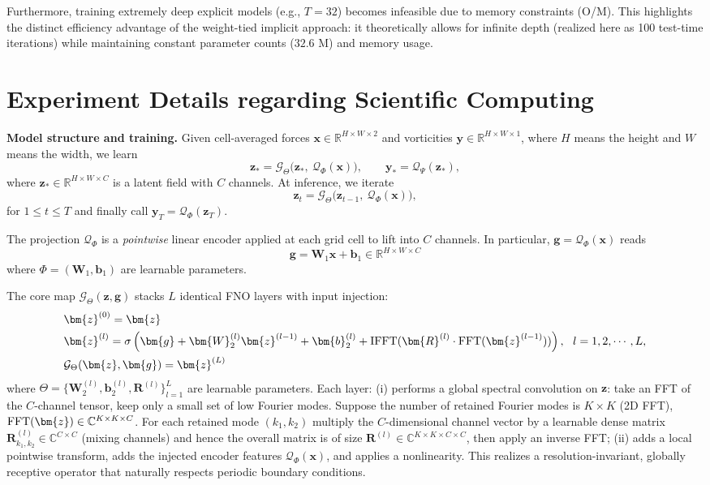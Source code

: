 \documentclass{amsart} %
\def\vb{{\bm{b}}}
\def\vg{{\bm{g}}}
\def\vx{{\bm{x}}}
\def\vy{{\bm{y}}}
\def\vz{{\bm{z}}}
\def\mR{{\bm{R}}}
\def\mW{{\bm{W}}}
\def\sC{{\mathbb{C}}}
\def\sR{{\mathbb{R}}}
\def\cG{{\mathcal{G}}}
\def\cQ{{\mathcal{Q}}}
\theoremstyle{definition}
\theoremstyle{remark}
\begin{document}
 Furthermore, training extremely deep explicit models (e.g., $T=32$) becomes infeasible due to memory constraints (O/M). This highlights the distinct efficiency advantage of the weight-tied implicit approach: it theoretically allows for infinite depth (realized here as 100 test-time iterations) while maintaining constant parameter counts ($32.6$ M) and memory usage.






\section{Experiment Details regarding Scientific Computing}
\label{sec:app-ns-exp}

\textbf{Model structure and training.}
Given cell-averaged forces $\vx\!\in\!\sR^{H\times W\times2}$ and vorticities $\vy\!\in\!\sR^{H\times W\times1}$, where $H$ means the height and $W$ means the width, we learn
\[
\vz_\ast = \cG_{\Theta}\!\big(\vz_\ast,\ \cQ_{\Phi}(\vx)\big),
\qquad
\vy_\ast = \cQ_{\Psi}(\vz_\ast),
\]
where $\vz_\ast\!\in\!\sR^{H\times W\times C}$ is a latent field with $C$ channels. At inference, we iterate 
\[\vz_{t}=\cG_{\Theta}\!\big(\vz_{t-1},\ \cQ_{\Phi}(\vx)\big),\]
for $1 \leq t \leq T$ and finally call $\vy_T=\cQ_{\Phi}(\vz_T)$.

The projection $\cQ_{\Phi}$ is a \emph{pointwise} linear encoder applied at each grid cell to lift into $C$ channels. In particular, $\vg=\cQ_{\Phi}(\vx)$ reads
\[ \vg = \mW_{1} \vx + \vb_{1}  \in \sR^{H\times W\times C} \]
where $\Phi=(\mW_{1},\vb_{1})$ are learnable parameters. 

The core map $\cG_{\Theta}(\vz,\vg)$ stacks $L$ identical FNO layers with input injection:
\begin{align*}
&\vz^{(0)} =  \vz \\
&\vz^{(l)} = \sigma\left( \vg + \mW^{(l)}_{2} \vz^{(l-1)} + \vb^{(l)}_2 + \textup{IFFT} (\mR^{(l)} \cdot \textup{FFT}(\vz^{(l-1)}) ) \right) , ~~ l = 1,2,\cdots,L,\\
&\cG_{\Theta}(\vz,\vg) =  \vz^{(L)}
\end{align*}
where $\Theta = \{\mW^{(l)}_{2}, \vb^{(l)}_2, \mR^{(l)}\}_{l=1}^L$ are learnable parameters.
Each layer:
(i) performs a {global spectral convolution} on $\vz$: take an FFT of the $C$-channel tensor, keep only a small set of low Fourier modes. Suppose the number of retained Fourier modes is $K \times K$ (2D FFT), $\textup{FFT}(\vz)\in\sC^{K \times K \times C}$. For each retained mode $(k_1,k_2)$ multiply the $C$-dimensional channel vector by a learnable dense matrix $\mR^{(l)}_{k_1,k_2}\in\sC^{C \times C}$ (mixing channels) and hence the overall matrix is of size $\mR^{(l)}\in\sC^{K \times K \times C \times C}$, then apply an inverse FFT; 
(ii) adds a {local pointwise transform}, adds the injected encoder features $\cQ_{\Phi}(\vx)$, and applies a nonlinearity.  This realizes a resolution-invariant, globally receptive operator that naturally respects periodic boundary conditions. 
\end{document}
